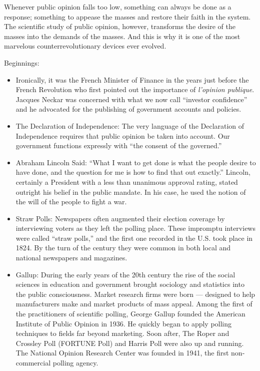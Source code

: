 \documentclass[12pt,book]{article}
\begin{document}
Whenever public opinion falls too low, something can always be done as a
response; something to appease the masses and restore their faith in the
system. The scientific study of public opinion, however, transforms the
desire of the masses into the demands of the masses. And this is why it
is one of the most marvelous counterrevolutionary devices ever evolved.

Beginnings:

\begin{itemize}
\item
  Ironically, it was the French Minister of Finance in the years just
  before the French Revolution who first pointed out the importance of
  \emph{l'opinion publique}. Jacques Neckar was concerned with what we
  now call ``investor confidence'' and he advocated for the publishing
  of government accounts and policies.
\item
  The Declaration of Independence: The very language of the Declaration
  of Independence requires that public opinion be taken into account.
  Our government functions expressly with ``the consent of the
  governed.''
\item
  Abraham Lincoln Said: ``What I want to get done is what the people
  desire to have done, and the question for me is how to find that out
  exactly.'' Lincoln, certainly a President with a less than unanimous
  approval rating, stated outright his belief in the public mandate. In
  his case, he used the notion of the will of the people to fight a war.
\item
  Straw Polls: Newspapers often augmented their election coverage by
  interviewing voters as they left the polling place. These impromptu
  interviews were called ``straw polls,'' and the first one recorded in
  the U.S. took place in 1824. By the turn of the century they were
  common in both local and national newspapers and magazines.
\item
  Gallup: During the early years of the 20th century the rise of the
  social sciences in education and government brought sociology and
  statistics into the public consciousness. Market research firms were
  born --- designed to help manufacturers make and market products of
  mass appeal. Among the first of the practitioners of scientific
  polling, George Gallup founded the American Institute of Public
  Opinion in 1936. He quickly began to apply polling techniques to
  fields far beyond marketing. Soon after, The Roper and Crossley Poll
  (FORTUNE Poll) and Harris Poll were also up and running. The National
  Opinion Research Center was founded in 1941, the first non-commercial
  polling agency.
\end{itemize}
\end{document}
